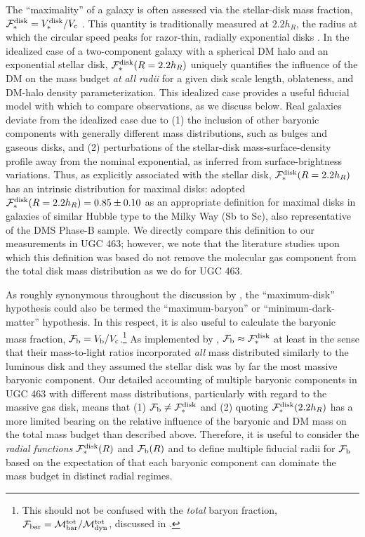 \documentclass[apj,iop,numberedappendix]{emulateapj}
\begin{document}
The ``maximality'' of a galaxy is often assessed via the stellar-disk mass
fraction, $\mathcal{F}_{\ast}^{\rm disk} = V^{\rm disk}_\ast/V_{\rm c}$ .  This quantity is traditionally measured at
$2.2h_R$, the radius at which the circular speed peaks for razor-thin, radially
exponential disks .  In the idealized case of a two-component galaxy
with a spherical DM halo and an exponential stellar disk, $\mathcal{F}_{\ast}^{\rm disk}(R=2.2h_R)$
uniquely quantifies the influence of the DM on the mass budget {\it at all
radii} for a given disk scale length, oblateness, and DM-halo density
parameterization.  This idealized case provides a useful fiducial model with
which to compare observations, as we discuss below.  Real galaxies deviate from
the idealized case due to (1) the inclusion of other baryonic components with
generally different mass distributions, such as bulges and gaseous disks, and
(2) perturbations of the stellar-disk mass-surface-density profile away from the
nominal exponential, as inferred from surface-brightness variations.  Thus, as
explicitly associated with the stellar disk, $\mathcal{F}_{\ast}^{\rm disk}(R=2.2h_R)$ has an intrinsic
distribution for maximal disks: \citet{1997ApJ...483..103S} adopted
$\mathcal{F}_{\ast}^{\rm disk}(R=2.2h_R) = 0.85\pm0.10$ as an appropriate definition for maximal disks
in galaxies of similar Hubble type to the Milky Way (Sb to Sc), also
representative of the DMS Phase-B sample.  We directly compare this definition
to our measurements in UGC 463; however, we note that the literature studies
upon which this definition was based do not remove the molecular gas component
from the total disk mass distribution as we do for UGC 463.

As roughly synonymous throughout the discussion by
, the ``maximum-disk'' hypothesis could also be
termed the ``maximum-baryon'' or ``minimum-dark-matter'' hypothesis.  In this
respect, it is also useful to calculate the baryonic mass fraction, $\mathcal{F}_{\rm b} =
V_{\rm b}/V_{\rm c}$.\footnote{
%
This should not be confused with the {\it total} baryon fraction, ${\mathcal
F}_{\rm bar} = \mathcal{M}^{\rm tot}_{\rm bar}/\mathcal{M}^{\rm tot}_{\rm dyn}$, discussed in .
%
} As implemented by , $\mathcal{F}_{\rm b} \approx \mathcal{F}_{\ast}^{\rm disk}$ at
least in the sense that their mass-to-light ratios incorporated {\it all} mass
distributed similarly to the luminous disk and they assumed the stellar disk was
by far the most massive baryonic component.  Our detailed accounting of multiple
baryonic components in UGC 463 with different mass distributions, particularly
with regard to the massive gas disk, means that (1) $\mathcal{F}_{\rm b} \neq \mathcal{F}_{\ast}^{\rm disk}$ and (2)
quoting $\mathcal{F}_{\ast}^{\rm disk} (2.2 h_R)$ has a more limited bearing on the relative influence
of the baryonic and DM mass on the total mass budget than described above.
Therefore, it is useful to consider the {\it radial functions} $\mathcal{F}_{\ast}^{\rm disk}(R)$ and
$\mathcal{F}_{\rm b}(R)$ and to define multiple fiducial radii for $\mathcal{F}_{\rm b}$ based on the
expectation of that each baryonic component can dominate the mass budget in
distinct radial regimes.  
\end{document}
